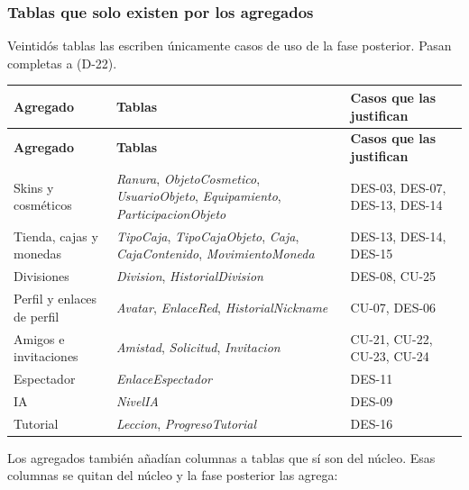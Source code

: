 \subsubsection*{Tablas que solo existen por los agregados}

Veintidós tablas las escriben únicamente casos de uso de la fase posterior. Pasan completas a  (\mbox{D-22}).

\begin{center}\small
\begin{longtable}{|L{0.28\textwidth}|L{0.34\textwidth}|L{0.26\textwidth}|}
\hline
\textbf{Agregado} & \textbf{Tablas} & \textbf{Casos que las justifican} \\ \hline
\endfirsthead
\hline
\textbf{Agregado} & \textbf{Tablas} & \textbf{Casos que las justifican} \\ \hline
\endhead
Skins y cosméticos & \textit{Ranura}, \textit{ObjetoCosmetico}, \textit{UsuarioObjeto}, \textit{Equipamiento}, \textit{ParticipacionObjeto} & \mbox{DES-03}, \mbox{DES-07}, \mbox{DES-13}, \mbox{DES-14} \\ \hline
Tienda, cajas y monedas & \textit{TipoCaja}, \textit{TipoCajaObjeto}, \textit{Caja}, \textit{CajaContenido}, \textit{MovimientoMoneda} & \mbox{DES-13}, \mbox{DES-14}, \mbox{DES-15} \\ \hline
Divisiones & \textit{Division}, \textit{HistorialDivision} & \mbox{DES-08}, \mbox{CU-25} \\ \hline
Perfil y enlaces de perfil & \textit{Avatar}, \textit{EnlaceRed}, \textit{HistorialNickname} & \mbox{CU-07}, \mbox{DES-06} \\ \hline
Amigos e invitaciones & \textit{Amistad}, \textit{Solicitud}, \textit{Invitacion} & \mbox{CU-21}, \mbox{CU-22}, \mbox{CU-23}, \mbox{CU-24} \\ \hline
Espectador & \textit{EnlaceEspectador} & \mbox{DES-11} \\ \hline
IA & \textit{NivelIA} & \mbox{DES-09} \\ \hline
Tutorial & \textit{Leccion}, \textit{ProgresoTutorial} & \mbox{DES-16} \\ \hline
\end{longtable}
\end{center}

Los agregados también añadían columnas a tablas que sí son del núcleo. Esas columnas se quitan del núcleo y la fase posterior las agrega:

